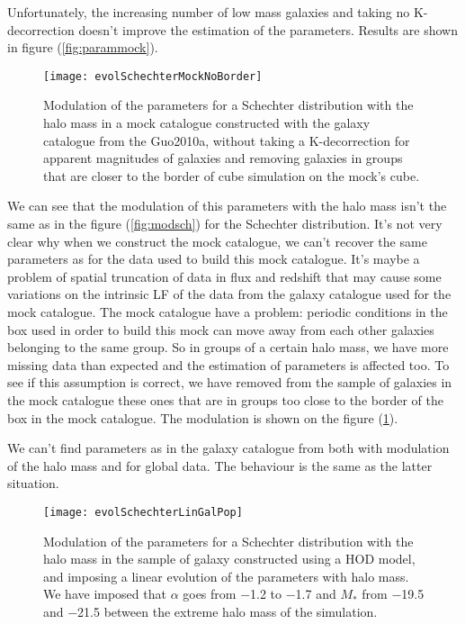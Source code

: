 Unfortunately, the increasing number of low mass galaxies and taking no K-decorrection doesn't improve the estimation of the
parameters. Results are shown in figure (\ref{fig:parammock}).
\begin{figure}[htb]
    \centering
    \texttt{[image: evolSchechterMockNoBorder]}
    \caption{\footnotesize{}Modulation of the parameters for a Schechter distribution with the halo mass in a mock catalogue
    constructed with the galaxy catalogue from the Guo2010a, without taking a K-decorrection for apparent magnitudes of
    galaxies and removing galaxies in groups that are closer to the border of cube simulation on the mock's cube.}
\label{fig:parammocknoborder}
\end{figure}

We can see that the modulation of this parameters with the halo mass isn't the same as in the figure (\ref{fig:modsch}) for the
Schechter distribution. It's not very clear why when we construct the mock catalogue, we can't recover the same parameters as for
the data used to build this mock catalogue. It's maybe a problem of spatial truncation of data in flux and redshift that may cause
some variations on the intrinsic LF of the data from the galaxy catalogue used for the mock catalogue. The mock catalogue have a
problem: periodic conditions in the box used in order to build this mock can move away from each other galaxies belonging to the
same group. So in groups of a certain halo mass, we have more missing data than expected and the estimation of parameters is
affected too. To see if this assumption is correct, we have removed from the sample of galaxies in the mock catalogue these ones
that are in groups too close to the border of the box in the mock catalogue. The modulation is shown on the figure
(\ref{fig:parammocknoborder}).

We can't find parameters as in the galaxy catalogue from \citet{Guo+11} both with modulation of the halo mass and for global data.
The behaviour is the same as the latter situation.
\begin{figure}[htb]
    \centering
    \texttt{[image: evolSchechterLinGalPop]}
    \caption{\footnotesize{}Modulation of the parameters for a Schechter distribution with the halo mass in the sample of galaxy
    constructed using a HOD model, and imposing a linear evolution of the parameters with halo mass. We have imposed that
    $\alpha$ goes from \num{-1.2} to \num{-1.7} and $M_*$ from \num{-19.5} and \num{-21.5} between the extreme halo mass of the
    simulation.}
\label{fig:paramschlin}
\end{figure}

